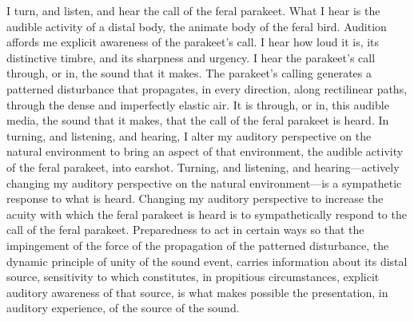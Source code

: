 \documentclass[12pt]{article}
\begin{document}
I turn, and listen, and hear the call of the feral parakeet. What I hear is the audible activity of a distal body, the animate body of the feral bird. Audition affords me explicit awareness of the parakeet’s call. I hear how loud it is, its distinctive timbre, and its sharpness and urgency. I hear the parakeet's call through, or in, the sound that it makes. The parakeet's calling generates a patterned disturbance that propagates, in every direction, along rectilinear paths, through the dense and imperfectly elastic air. It is through, or in, this audible media, the sound that it makes, that the call of the feral parakeet is heard. In turning, and listening, and hearing, I alter my auditory perspective on the natural environment to bring an aspect of that environment, the audible activity of the feral parakeet, into earshot. Turning, and listening, and hearing---actively changing my auditory perspective on the natural environment---is a sympathetic response to what is heard. Changing my auditory perspective to increase the acuity with which the feral parakeet is heard is to sympathetically respond to the call of the feral parakeet. Preparedness to act in certain ways so that the impingement of the force of the propagation of the patterned disturbance, the dynamic principle of unity of the sound event, carries information about its distal source, sensitivity to which constitutes, in propitious circumstances, explicit auditory awareness of that source, is what makes possible the presentation, in auditory experience, of the source of the sound. 


\nocite{Shields:2016ix}
\nocite{Hett:1936fk}
\nocite{Locke:1975pi}
\nocite{Lindberg:1998dy}
\nocite{Hobbes:1904hw}
\nocite{Descartes:1985df}
\nocite{Berkeley:1734fk}

 
 
\end{document}
